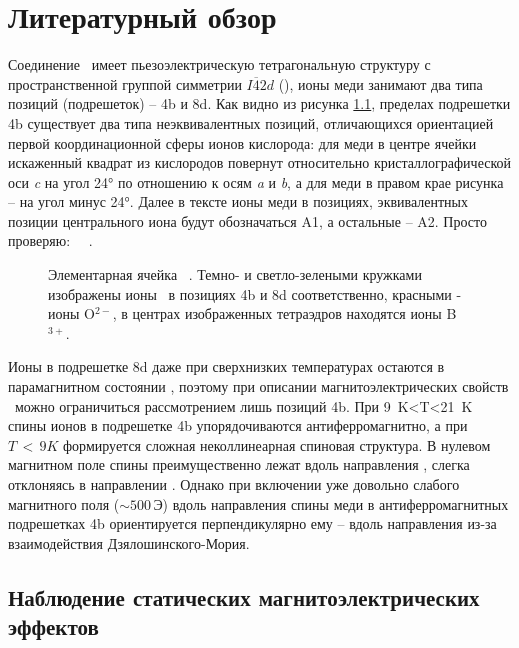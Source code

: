 \chapter{Литературный обзор}\label{ch:ch1}

Соединение \cbo\ имеет пьезоэлектрическую тетрагональную структуру с пространственной группой симметрии \(I\overline{4}2d\) (), ионы меди занимают два типа позиций (подрешеток) – 4b и 8d. Как видно из рисунка \cref{fig:unit-cell}, пределах подрешетки 4b существует два типа неэквивалентных позиций, отличающихся ориентацией первой координационной сферы ионов кислорода: для меди в центре ячейки искаженный квадрат из кислородов повернут относительно кристаллографической оси \emph{c} на угол \ang{24} по отношению к осям \emph{a} и \emph{b}, а для меди в правом крае рисунка -- на угол минус \ang{24}. Далее в тексте ионы меди в позициях, эквивалентных позиции центрального иона будут обозначаться A1, а остальные -- A2. Просто проверяю: \cud\, \niIon\, \nif. 

\begin{figure}[ht]
	\label{fig:unit-cell}
	\caption{Элементарная ячейка \cbo\ \cite{Martinez1971}. Темно- и светло-зелеными кружками изображены ионы \cu\ в позициях 4b и 8d соответственно, красными - ионы O\(^{2-}\), в центрах изображенных тетраэдров находятся ионы B\(^{3+}\). }
\end{figure}

Ионы в подрешетке 8d даже при сверхнизких температурах остаются в парамагнитном состоянии \cite{Boehm2003}, поэтому при описании магнитоэлектрических свойств \cbo\ можно ограничиться рассмотрением лишь позиций 4b. При \SI{9}{\kelvin}<T<\SI{21}{\kelvin} спины ионов в подрешетке 4b  упорядочиваются антиферромагнитно, а при \(T\,{<}\,9K\) формируется сложная неколлинеарная спиновая структура.  В нулевом магнитном поле спины преимущественно лежат вдоль направления , слегка отклоняясь в направлении  \cite{Boehm2003}. Однако при включении уже довольно слабого магнитного поля (\({\sim}500\,\)Э) вдоль направления  спины меди в антиферромагнитных подрешетках 4b ориентируется перпендикулярно ему – вдоль направления  \cite{Toyoda2019} из-за взаимодействия Дзялошинского-Мория.

\section{Наблюдение статических магнитоэлектрических эффектов}\label{sec:ch1/sec1}

